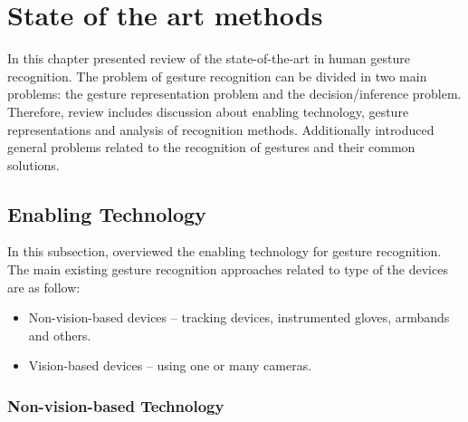 \section{State of the art methods}
In this chapter presented review of the state-of-the-art in human gesture recognition. The problem of gesture recognition can be divided in two main problems: the gesture representation problem and the decision/inference problem. Therefore, review includes discussion about enabling technology, gesture representations and analysis of recognition methods. Additionally introduced general problems related to the recognition of gestures and their common solutions.

\subsection{Enabling Technology}
In this subsection, overviewed the enabling technology for gesture recognition. The main existing gesture recognition approaches related to type of the devices are as follow:
\begin{itemize}
\item Non-vision-based devices -- tracking devices, instrumented gloves, armbands and others.
\item Vision-based devices -- using one or many cameras.
\end{itemize}

\subsubsection{Non-vision-based Technology}

